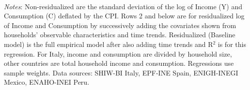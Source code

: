 \documentclass[12pt]{article}
\begin{document}
\begin{spacing}{1.5}
\begin{table}[H]
\begin{centering}
\caption{Standard deviation of income and consumption by residualization
{\label{tab_residualization}}}
\vspace*{-0.2em}
  \\

\par\end{centering}
\medskip{}

\raggedright{}\textit{\footnotesize{}Notes}{\footnotesize{}: Non-residualized are the standard deviation of the log of Income (Y) and Consumption (C) deflated by the CPI. Rows 2 and below are for residualized log of Income and Consumption by successively adding the covariates shown from households' observable characteristics and time trends. Residualized (Baseline model) is the full empirical model after also adding time trends and R$^2$ is for this regression. For Italy, income and consumption are divided by household size, other countries are total household income and consumption. Regressions use sample weights. Data sources: SHIW-BI Italy, EPF-INE Spain, ENIGH-INEGI Mexico, ENAHO-INEI Peru. }{\footnotesize\par}


\end{table}
\end{spacing}
\end{document}

